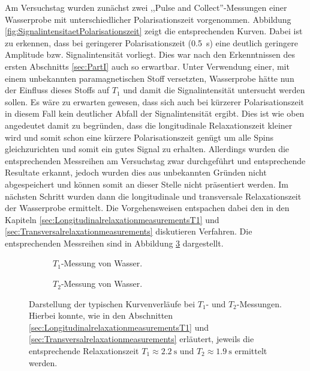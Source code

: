 Am Versuchstag wurden zunächst zwei ,,Pulse and Collect''-Messungen einer Wasserprobe mit unterschiedlicher Polarisationszeit vorgenommen.
Abbildung \ref{fig:SignalintensitaetPolarisationszeit} zeigt die entsprechenden Kurven.
Dabei ist zu erkennen, dass bei geringerer Polarisationszeit (\SI{0.5}{\second}) eine deutlich geringere Amplitude bzw. Signalintensität vorliegt.
Dies war nach den Erkenntnissen des ersten Abschnitts \ref{sec:PartI} auch so erwartbar.
Unter Verwendung einer, mit einem unbekannten paramagnetischen Stoff versetzten, Wasserprobe hätte nun der Einfluss dieses Stoffs auf $T_1$ und damit die Signalintensität untersucht werden sollen.
Es wäre zu erwarten gewesen, dass sich auch bei kürzerer Polarisationszeit in diesem Fall kein deutlicher Abfall der Signalintensität ergibt.
Dies ist wie oben angedeutet damit zu begründen, dass die longitudinale Relaxationszeit kleiner wird und somit schon eine kürzere Polarisationszeit genügt um alle Spins gleichzurichten und somit ein gutes Signal zu erhalten.
Allerdings wurden die entsprechenden Messreihen am Versuchstag zwar durchgeführt und entsprechende Resultate erkannt, jedoch wurden dies aus unbekannten Gründen nicht abgespeichert und können somit an dieser Stelle nicht präsentiert werden.\newline
\newline
Im nächsten Schritt wurden dann die longitudinale und transversale Relaxationszeit der Wasserprobe ermittelt.
Die Vorgehensweisen entspachen dabei den in den Kapiteln \ref{sec:LongitudinalrelaxationmeasurementsT1} und \ref{sec:Transversalrelaxationmeasurements} diskutieren Verfahren.
Die entsprechenden Messreihen sind in Abbildung \ref{fig:T1T2Wasser} dargestellt.

\begin{figure}[H]
    \begin{subfigure}[b]{0.5\textwidth}
        \centering
        \resizebox{1\textwidth}{!}{}
        \caption{$T_1$-Messung von Wasser.}
        \label{fig:T1Wasser}
    \end{subfigure}
    \begin{subfigure}[b]{0.5\textwidth}
        \centering
        \resizebox{1\textwidth}{!}{}
        \caption{$T_2$-Messung von Wasser.}
        \label{fig:T2Wasser}
    \end{subfigure}
    \caption[$T_1$- und $T_2$-Messung von Wasser.]{Darstellung der typischen Kurvenverläufe bei $T_1$- und $T_2$-Messungen.
    Hierbei konnte, wie in den Abschnitten \ref{sec:LongitudinalrelaxationmeasurementsT1} und \ref{sec:Transversalrelaxationmeasurements} erläutert, jeweils die entsprechende Relaxationszeit $T_1 \approx \SI{2.2}{\second}$ und $T_2 \approx \SI{1.9}{\second}$ ermittelt werden.}
    \label{fig:T1T2Wasser}
\end{figure}

